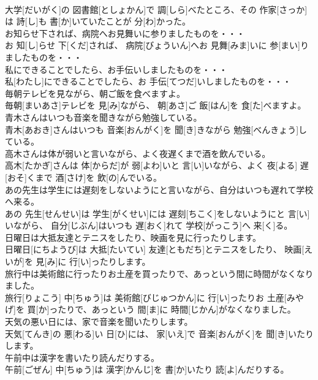 \documentclass[8pt]{extreport}
\begin{document}
\begin{CJK}{UTF8}{min}
\\	大学[だいがく]の 図書館[としょかん]で 調[しら]べたところ、その 作家[さっか]は 詩[し]も 書[か]いていたことが 分[わ]かった。	
\\	お知らせ下されば、病院へお見舞いに参りましたものを・・・	
\\	お 知[し]らせ 下[くだ]されば、 病院[びょういん]へお 見舞[みま]いに 参[まい]りましたものを・・・	
\\	私にできることでしたら、お手伝いしましたものを・・・	
\\	私[わたし]にできることでしたら、お 手伝[てつだ]いしましたものを・・・	
\\	毎朝テレビを見ながら、朝ご飯を食べますよ。	
\\	毎朝[まいあさ]テレビを 見[み]ながら、 朝[あさ]ご 飯[はん]を 食[た]べますよ。	
\\	青木さんはいつも音楽を聞きながら勉強している。	
\\	青木[あおき]さんはいつも 音楽[おんがく]を 聞[き]きながら 勉強[べんきょう]している。	
\\	高木さんは体が弱いと言いながら、よく夜遅くまで酒を飲んでいる。	
\\	高木[たかぎ]さんは 体[からだ]が 弱[よわ]いと 言[い]いながら、よく 夜[よる] 遅[おそ]くまで 酒[さけ]を 飲[の]んでいる。	
\\	あの先生は学生には遅刻をしないようにと言いながら、自分はいつも遅れて学校へ来る。	
\\	あの 先生[せんせい]は 学生[がくせい]には 遅刻[ちこく]をしないようにと 言[い]いながら、 自分[じぶん]はいつも 遅[おく]れて 学校[がっこう]へ 来[く]る。	
\\	日曜日は大抵友達とテニスをしたり、映画を見に行ったりします。	
\\	日曜日[にちようび]は 大抵[たいてい] 友達[ともだち]とテニスをしたり、 映画[えいが]を 見[み]に 行[い]ったりします。	
\\	旅行中は美術館に行ったりお土産を買ったりで、あっという間に時間がなくなりました。	
\\	旅行[りょこう] 中[ちゅう]は 美術館[びじゅつかん]に 行[い]ったりお 土産[みやげ]を 買[か]ったりで、あっという 間[ま]に 時間[じかん]がなくなりました。	
\\	天気の悪い日には、家で音楽を聞いたりします。	
\\	天気[てんき]の 悪[わる]い 日[ひ]には、 家[いえ]で 音楽[おんがく]を 聞[き]いたりします。	
\\	午前中は漢字を書いたり読んだりする。	
\\	午前[ごぜん] 中[ちゅう]は 漢字[かんじ]を 書[か]いたり 読[よ]んだりする。	

\end{CJK}
\end{document}
